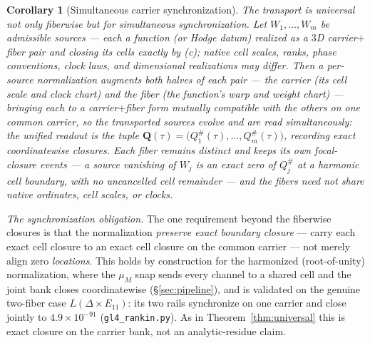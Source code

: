 \documentclass[11pt]{article}
\newtheorem{corollary}[theorem]{Corollary}
\theoremstyle{definition}
\begin{document}
\begin{corollary}[Simultaneous carrier synchronization]\label{cor:sync}
The transport is universal not only fiberwise but for \emph{simultaneous synchronization}. Let $W_1,\dots,W_m$ be
admissible sources --- each a function (or Hodge datum) realized as a $3$D carrier$+$fiber pair and closing its
cells exactly by \textup{(c)}; native cell scales, ranks, phase conventions, clock laws, and dimensional
realizations may differ. Then a per-source \emph{normalization} augments \emph{both} halves of each pair --- the
carrier (its cell scale and clock chart) and the fiber (the function's warp and weight chart) --- bringing each to
a carrier$+$fiber form mutually compatible with the others on one common carrier, so the transported sources
evolve and are read \emph{simultaneously}: the unified readout is the tuple
$\mathbf Q(\tau)=\big(Q_1^\#(\tau),\dots,Q_m^\#(\tau)\big)$, recording exact coordinatewise closures. Each fiber
remains distinct and keeps its own focal-closure events --- a source vanishing of $W_j$ is an exact zero of
$Q_j^\#$ at a harmonic cell boundary, with no uncancelled cell remainder --- and the fibers need not share native
ordinates, cell scales, or clocks.
\end{corollary}

\emph{The synchronization obligation.} The one requirement beyond the fiberwise closures is that the
normalization \emph{preserve exact boundary closure} --- carry each exact cell closure to an exact cell closure on
the common carrier --- not merely align zero \emph{locations}. This holds by construction for the harmonized
(root-of-unity) normalization, where the $\mu_M$ snap sends every channel to a shared cell and the joint bank
closes coordinatewise (\S\ref{sec:pipeline}), and is validated on the genuine two-fiber case $L(\Delta\times
E_{11})$: its two rails synchronize on one carrier and close jointly to $4.9\times10^{-91}$
(\texttt{gl4\_rankin.py}). As in Theorem~\ref{thm:universal} this is exact closure on the carrier bank, not an
analytic-residue claim.
\end{document}
